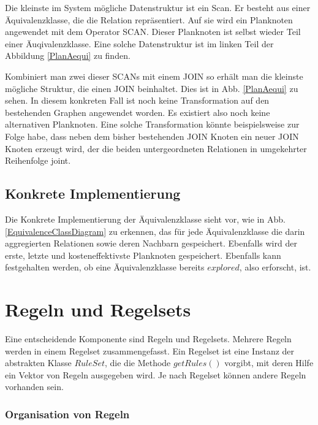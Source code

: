Die kleinste im System mögliche Datenstruktur ist ein Scan. Er besteht aus einer Äquivalenzklasse, die die Relation repräsentiert. Auf sie wird ein Planknoten angewendet mit dem Operator SCAN. Dieser Planknoten ist selbst wieder Teil einer Äuqivalenzklasse. Eine solche Datenstruktur ist im linken Teil der Abbildung \ref{PlanAequi} zu finden.

Kombiniert man zwei dieser SCANs mit einem JOIN so erhält man die kleinste mögliche Struktur, die einen JOIN beinhaltet. Dies ist in Abb. \ref{PlanAequi} zu sehen. In diesem konkreten Fall ist noch keine Transformation auf den bestehenden Graphen angewendet worden. Es existiert also noch keine alternativen Planknoten. Eine solche Transformation könnte beispielsweise zur Folge habe, dass neben dem bisher bestehenden JOIN Knoten ein neuer JOIN Knoten erzeugt wird, der die beiden untergeordneten Relationen in umgekehrter Reihenfolge joint.


\subsection{Konkrete Implementierung}

Die Konkrete Implementierung der Äquivalenzklasse sieht vor, wie in Abb. \ref{EquivalenceClassDiagram} zu erkennen, das für jede Äquivalenzklasse die darin aggregierten Relationen sowie deren Nachbarn gespeichert. Ebenfalls wird der erste, letzte und kosteneffektivste Planknoten gespeichert. Ebenfalls kann festgehalten werden, ob eine Äquivalenzklasse bereits $explored$, also erforscht, ist. 




\section{Regeln und Regelsets}


Eine entscheidende Komponente sind Regeln und Regelsets. Mehrere Regeln werden in einem Regelset zusammengefasst. Ein Regelset ist eine Instanz der abstrakten Klasse $RuleSet$, die die Methode $getRules()$ vorgibt, mit deren Hilfe ein Vektor von Regeln ausgegeben wird. Je nach Regelset können andere Regeln vorhanden sein.







\subsubsection{Organisation von Regeln}


